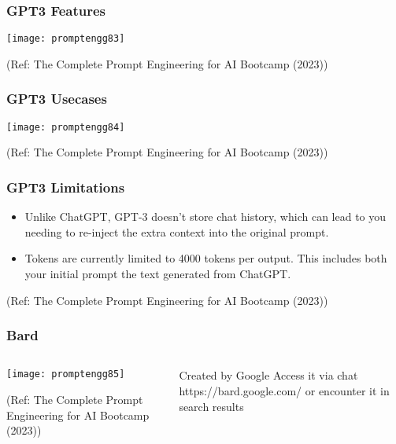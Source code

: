 \begin{frame}[fragile]\frametitle{GPT3 Features}


		\begin{center}
		\texttt{[image: promptengg83]}

		{\tiny (Ref: The Complete Prompt Engineering for AI Bootcamp (2023))}
		\end{center}	

\end{frame}


\begin{frame}[fragile]\frametitle{GPT3 Usecases}


		\begin{center}
		\texttt{[image: promptengg84]}

		{\tiny (Ref: The Complete Prompt Engineering for AI Bootcamp (2023))}
		\end{center}	

\end{frame}

\begin{frame}[fragile]\frametitle{GPT3 Limitations}




\begin{itemize}
\item  Unlike ChatGPT, GPT-3 doesn’t store chat history, which can lead to you needing to re-inject the extra context into the
original prompt.
\item Tokens are currently limited to 4000 tokens per output. This includes both your initial prompt the text generated
from ChatGPT.

\end{itemize}	 

{\tiny (Ref: The Complete Prompt Engineering for AI Bootcamp (2023))}

\end{frame}


\begin{frame}[fragile]\frametitle{Bard}


\begin{columns}
    \begin{column}[T]{0.6\linewidth}
		\begin{center}
		\texttt{[image: promptengg85]}

		{\tiny (Ref: The Complete Prompt Engineering for AI Bootcamp (2023))}
		\end{center}	
    \end{column}
    \begin{column}[T]{0.4\linewidth}
		Created by Google
		Access it via chat https://bard.google.com/ or encounter it in search results
    \end{column}
  \end{columns}
\end{frame}

